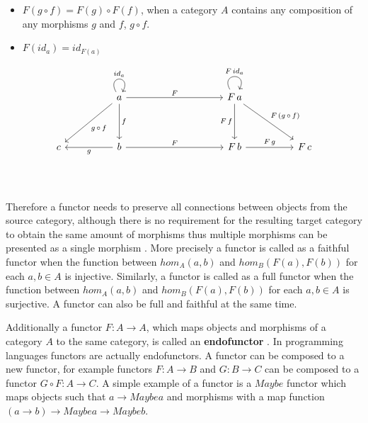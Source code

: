 \documentclass[article]{aaltoseries}
\begin{document}
    \begin{itemize}
      \item $F(g \circ f) = F(g) \circ F(f)$, when a category $A$ contains any composition of any morphisms $g$ and $f$, $g \circ f$.
      \item $F(id_a) = id_{F(a)}$
    \end{itemize}

    \[
      \begin{tikzcd}[row sep=huge, column sep=huge]
        & a \arrow[d, "f"] \arrow[dl, "g\, \circ\, f"] \arrow[r, "F"] \arrow[loop, distance=2em, in=60, out=120, "id_a"]
        &[5em] F\, a \arrow[d, "F\, f"'] \arrow[dr, "F\, (g\, \circ\, f)"]
                   \arrow[loop, distance=2em, in=60, out=120, "F\, id_a"]
        & \\
        c
        & b \arrow[l, "g"] \arrow[r, "F"]
        & F\, b \arrow[r, "F\, g"]
        & F\, c \\
      \end{tikzcd}
    \]

    Therefore a functor needs to preserve all connections between objects from
    the source category, although there is no requirement for the resulting
    target category to obtain the same amount of morphisms thus multiple
    morphisms can be presented as a single morphism \cite{computational,
      barr1990category}. More precisely a functor is called as a faithful
    functor when the function between $hom_A(a, b)$ and $hom_B(F(a), F(b))$ for each
    $a, b \in A$ is injective. Similarly, a functor is called as a full functor when
    the function between $hom_A(a, b)$ and $hom_B(F(a), F(b))$ for each $a, b \in A$ is
    surjective. A functor can also be full and faithful at the same time.
 
    Additionally a functor $F: A \rightarrow A$, which maps objects and morphisms of a category
    $A$ to the same category, is called an \textbf{endofunctor} \cite{computational,
    barr1990category}. In programming languages functors are actually
    endofunctors. A functor can be composed to a new functor, for example functors
    $F: A \rightarrow B$ and $G: B \rightarrow C$ can be composed to a functor $G \circ F: A \rightarrow C$. A simple
    example of a functor is a $Maybe$ functor which maps objects such that $a \rightarrow Maybe a$
    and morphisms with a map function $(a \rightarrow b) \rightarrow Maybe a \rightarrow Maybe b$.

\end{document}
